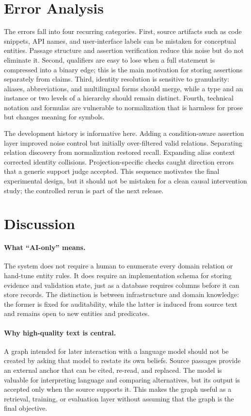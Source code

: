 \documentclass[11pt]{article}
\begin{document}
\section{Error Analysis}
\label{sec:error}

The errors fall into four recurring categories. First, source artifacts such as code snippets, API names, and user-interface labels can be mistaken for conceptual entities. Passage structure and assertion verification reduce this noise but do not eliminate it. Second, qualifiers are easy to lose when a full statement is compressed into a binary edge; this is the main motivation for storing assertions separately from claims. Third, identity resolution is sensitive to granularity: aliases, abbreviations, and multilingual forms should merge, while a type and an instance or two levels of a hierarchy should remain distinct. Fourth, technical notation and formulas are vulnerable to normalization that is harmless for prose but changes meaning for symbols.

The development history is informative here. Adding a condition-aware assertion layer improved noise control but initially over-filtered valid relations. Separating relation discovery from normalization restored recall. Expanding alias context corrected identity collisions. Projection-specific checks caught direction errors that a generic support judge accepted. This sequence motivates the final experimental design, but it should not be mistaken for a clean causal intervention study; the controlled rerun is part of the next release.

\section{Discussion}
\label{sec:discussion}

\paragraph{What ``AI-only'' means.} The system does not require a human to enumerate every domain relation or hand-tune entity rules. It does require an implementation schema for storing evidence and validation state, just as a database requires columns before it can store records. The distinction is between infrastructure and domain knowledge: the former is fixed for auditability, while the latter is induced from source text and remains open to new entities and predicates.

\paragraph{Why high-quality text is central.} A graph intended for later interaction with a language model should not be created by asking that model to restate its own beliefs. Source passages provide an external anchor that can be cited, re-read, and replaced. The model is valuable for interpreting language and comparing alternatives, but its output is accepted only when the source supports it. This makes the graph useful as a retrieval, training, or evaluation layer without assuming that the graph is the final objective.
\end{document}
